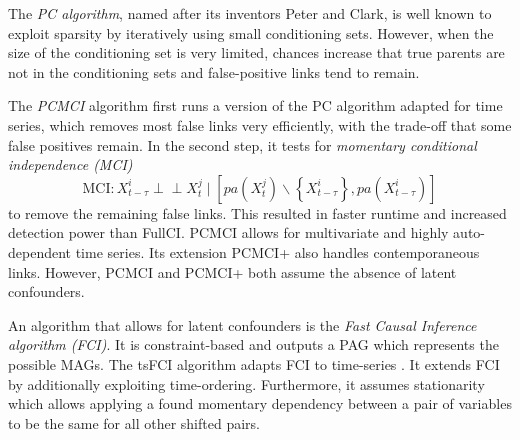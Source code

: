 \documentclass[conference]{IEEEtran}
\begin{document}
The \textit{PC algorithm}, named after its inventors Peter and Clark, is well known to exploit sparsity by iteratively using small conditioning sets\cite{runge_pcmci_2019}. However, when the size of the conditioning set is very limited, chances increase that true parents are not in the conditioning sets and false-positive links tend to remain\cite{runge_pcmci_2019}.

The \textit{PCMCI} algorithm first runs a version of the PC algorithm adapted for time series, which removes most false links very efficiently, with the trade-off that some false positives remain\cite{runge_pcmci_2019}. In the second step, it tests for \textit{momentary conditional independence (MCI)}
\begin{equation}
\mathrm{MCI}: X_{t-\tau}^{i} \!\perp\!\!\!\perp X_{t}^{j} \mid \left[{pa}\left(X_{t}^{j}\right) \backslash\left\{X_{t-\tau}^{i}\right\}, {pa}\left(X_{t-\tau}^{i}\right)\right]
\end{equation}
to remove the remaining false links\cite{runge_pcmci_2019}.
This resulted in faster runtime and increased detection power than FullCI\cite{runge_pcmci_2019}.
PCMCI allows for multivariate and highly auto-dependent time series. Its extension PCMCI+ also handles contemporaneous links. However, PCMCI and PCMCI+ both assume the absence of latent confounders.

An algorithm that allows for latent confounders is the \textit{Fast Causal Inference algorithm (FCI)}\cite{spirtes_causation_2000}. It is constraint-based and outputs a PAG which represents the possible MAGs.
The tsFCI algorithm adapts FCI to time-series \cite{entner_causal_2010}. It extends FCI by additionally exploiting time-ordering. Furthermore, it assumes stationarity which allows applying a found momentary dependency between a pair of variables to be the same for all other shifted pairs.
\end{document}
